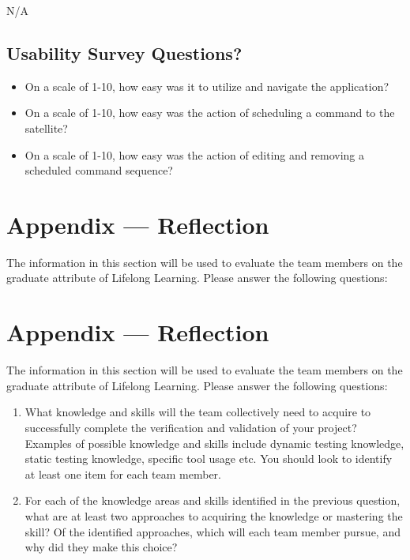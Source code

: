 \documentclass[12pt, titlepage]{article}
\begin{document}
N/A

\subsection{Usability Survey Questions?}

\begin{itemize}
    \item On a scale of 1-10, how easy was it to utilize and navigate the application?
    \item On a scale of 1-10, how easy was the action of scheduling a command to the satellite?
    \item On a scale of 1-10, how easy was the action of editing and removing a scheduled command sequence?
\end{itemize}

\newpage{}
\section*{Appendix --- Reflection}

The information in this section will be used to evaluate the team members on the
graduate attribute of Lifelong Learning.  Please answer the following questions:

\newpage{}
\section*{Appendix --- Reflection}


The information in this section will be used to evaluate the team members on the
graduate attribute of Lifelong Learning.  Please answer the following questions:

\begin{enumerate}
  \item What knowledge and skills will the team collectively need to acquire to
  successfully complete the verification and validation of your project?
  Examples of possible knowledge and skills include dynamic testing knowledge,
  static testing knowledge, specific tool usage etc.  You should look to
  identify at least one item for each team member.
  \item For each of the knowledge areas and skills identified in the previous
  question, what are at least two approaches to acquiring the knowledge or
  mastering the skill?  Of the identified approaches, which will each team
  member pursue, and why did they make this choice?
\end{enumerate}
\end{document}
